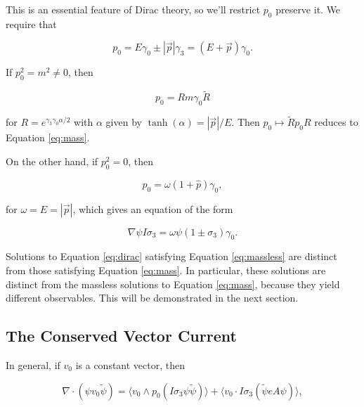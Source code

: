 \documentclass{article}
\begin{document}
  This is an essential feature of Dirac theory, so we'll restrict $p_0$ preserve it. We require that

  \begin{equation}
    p_0 = E \gamma_0 \pm |\vec p| \gamma_3 = (E + \vec p) \gamma_0.
  \end{equation} 

  If $p_0^2 = m^2 \not= 0$, then 

  \begin{equation}
    p_0 = R m \gamma_0 \widetilde R
  \end{equation} 

   for $R = e^{\gamma_3 \gamma_0 \alpha/2}$ with $\alpha$ given by $\tanh(\alpha) = |\vec p|/E$. Then $p_0 \mapsto \widetilde R p_0 R$ reduces to Equation \ref{eq:mass}.

  On the other hand, if $p_0^2 = 0$, then

  \begin{equation}
    p_0 = \omega (1 + \hat p) \gamma_0, \label{eq:massless}
  \end{equation}

  for $\omega = E = |\vec p|$, which gives an equation of the form

  \begin{equation}
    \nabla \psi I \sigma_3 = \omega \psi (1 \pm \sigma_3) \gamma_0.\label{eq:extension}
  \end{equation}


  Solutions to Equation \ref{eq:dirac} satisfying Equation \ref{eq:massless} are distinct from those satisfying Equation \ref{eq:mass}. In particular, these solutions are distinct from the massless solutions to Equation \ref{eq:mass}, because they yield different observables. This will be demonstrated in the next section.

  \subsection{The Conserved Vector Current}

  In general, if $v_0$ is a constant vector, then

  \begin{equation}
    \nabla \cdot (\psi v_0 \widetilde \psi) = \langle v_0 \wedge p_0 (I \sigma_3 \psi \widetilde \psi) \rangle + \langle v_0 \cdot I \sigma_3 (\widetilde \psi e A \psi) \rangle,
  \end{equation}
\end{document}
